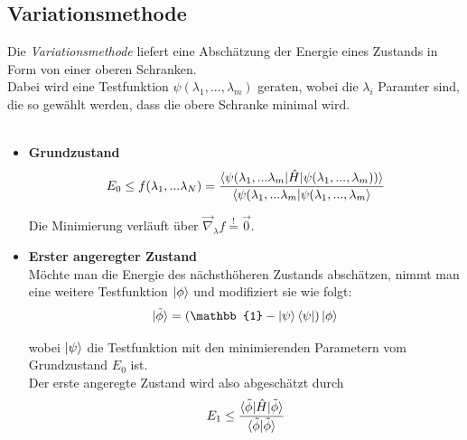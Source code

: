 \documentclass{article}
\begin{document}
\subsection{Variationsmethode}
Die \textit{Variationsmethode} liefert eine Abschätzung der Energie eines Zustands in Form von einer oberen Schranken.\\
Dabei wird eine Testfunktion $\psi(\lambda_1,...,\lambda_m)$ geraten, wobei die $\lambda_i$ Paramter sind, die so gewählt werden, dass die obere Schranke minimal wird.\\
\\
	\begin{itemize}
		\item \textbf{Grundzustand}
		\begin{equation}
			E_0 \leq f(\lambda_1,...\lambda_N) = \frac{\braket{\psi(\lambda_1,...\lambda_m | \hat{H} | \psi(\lambda_1,...,\lambda_m))}}{\braket{\psi(\lambda_1,...\lambda_m | \psi(\lambda_1,...,\lambda_m}}
		\end{equation}
	
	Die Minimierung verläuft über $\vec{\nabla}_\lambda f \stackrel{!}{=} \vec{0}$.
	
		\item \textbf{Erster angeregter Zustand}\\
	Möchte man die Energie des nächsthöheren Zustands abschätzen, nimmt man eine weitere Testfunktion $\ket{\phi}$ und modifiziert sie wie folgt:
		\begin{equation}
			\ket{\tilde{\phi}} = (\mathbb{1} - \ket{\psi}\bra{\psi}) \ket{\phi}
		\end{equation}
	
	wobei $\ket{\psi}$ die Testfunktion mit den minimierenden Parametern vom Grundzustand $E_0$ ist.\\
	Der erste angeregte Zustand wird also abgeschätzt durch
		\begin{equation}
			E_1 \leq \frac{\braket{\tilde{\phi} | \hat{H} | \tilde{\phi}}}{\braket{\tilde{\phi} | \tilde{\phi}}}
		\end{equation}
	\end{itemize}
\end{document}
